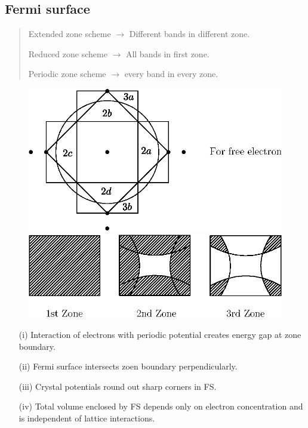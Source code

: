 \chapter[Lecture 24]{}\label{lec24}

\section*{Fermi surface}
\begin{quote}
Extended zone scheme $\to$ Different bands in different zone.

Reduced zone scheme $\to$ All bands in first zone.

Periodic zone scheme $\to$ every band in every zone.
\end{quote}
\begin{figure}[H]
\centering
\includegraphics{images/lecture24/fig9.eps}

\includegraphics{images/lecture24/fig10.eps}
\end{figure}

\newpage

\begin{itemize}
\itemsep=0pt
\item[(i)] Interaction of electrons with periodic potential creates energy gap at zone boundary.

\item[(ii)] Fermi surface intersects zoen boundary perpendicularly.

\item[(iii)] Crystal potentials round out sharp corners in FS.

\item[(iv)] Total volume enclosed by FS depends only on electron concentration and is independent of lattice interactions.
\end{itemize}

